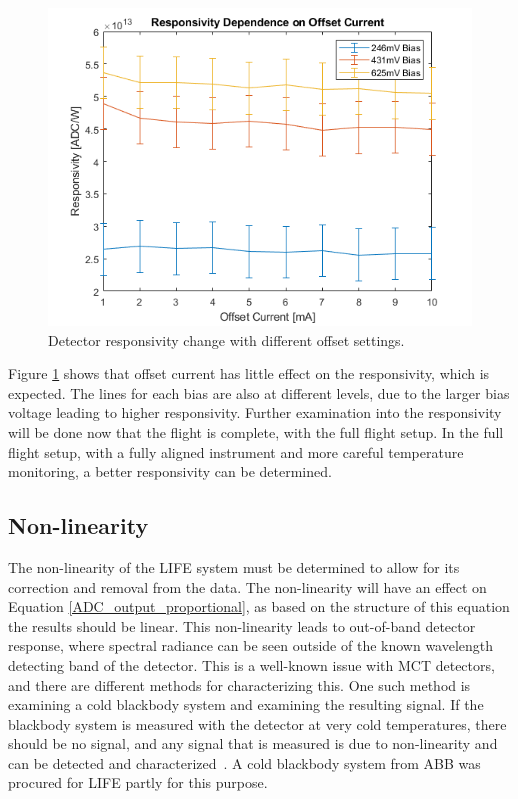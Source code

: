 \begin{figure}[h]
  \includegraphics[width=\linewidth]{chap6_images/verification/resp_dependence_on_offset.png}
  \caption{Detector responsivity change with different offset settings.}
  \label{fig:resp_dep_on_offset}
\end{figure}

Figure \ref{fig:resp_dep_on_offset} shows that offset current has little effect on the responsivity, which is expected. The lines for each bias are also at different levels, due to the larger bias voltage leading to higher responsivity. Further examination into the responsivity will be done now that the flight is complete, with the full flight setup. In the full flight setup, with a fully aligned instrument and more careful temperature monitoring, a better responsivity can be determined.

\subsection{Non-linearity}
The non-linearity of the LIFE system must be determined to allow for its correction and removal from the data. The non-linearity will have an effect on Equation \ref{ADC_output_proportional}, as based on the structure of this equation the results should be linear. This non-linearity leads to out-of-band detector response, where spectral radiance can be seen outside of the known wavelength detecting band of the detector. This is a well-known issue with MCT detectors, and there are different methods for characterizing this. One such method is examining a cold blackbody system and examining the resulting signal. If the blackbody system is measured with the detector at very cold temperatures, there should be no signal, and any signal that is measured is due to non-linearity and can be detected and characterized~\citep{non-linearity_correction}. A cold blackbody system from ABB was procured for LIFE partly for this purpose.

